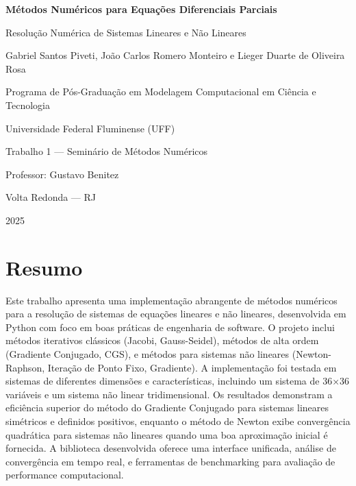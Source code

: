 \documentclass[12pt,a4paper]{article}
\begin{document}
\begin{titlepage}
  \begin{center}
    \vspace*{1.cm}

    {\LARGE \textbf{Métodos Numéricos para Equações Diferenciais Parciais} \par}
    \vspace{0.8cm}
    {\Large Resolução Numérica de Sistemas Lineares e Não Lineares \par}
    \vspace{2.5cm}

    {\large Gabriel Santos Piveti, João Carlos Romero Monteiro e Lieger Duarte de Oliveira Rosa \par}
    \vspace{1.5cm}
    {\small Programa de Pós-Graduação em Modelagem Computacional em Ciência e Tecnologia \par}
    {\small Universidade Federal Fluminense (UFF) \par}

    \vfill

    {\normalsize Trabalho 1 — Seminário de Métodos Numéricos \par}
    \vspace{0.3cm}
    {\normalsize Professor: Gustavo Benitez \par}
    \vspace{0.8cm}
    {\normalsize Volta Redonda — RJ \par}
    {\normalsize 2025 \par}
  \end{center}
\end{titlepage}


\section{Resumo}

Este trabalho apresenta uma implementação abrangente de métodos numéricos para a resolução de sistemas de equações lineares e não lineares, desenvolvida em Python com foco em boas práticas de engenharia de software. O projeto inclui métodos iterativos clássicos (Jacobi, Gauss-Seidel), métodos de alta ordem (Gradiente Conjugado, CGS), e métodos para sistemas não lineares (Newton-Raphson, Iteração de Ponto Fixo, Gradiente). A implementação foi testada em sistemas de diferentes dimensões e características, incluindo um sistema de 36×36 variáveis e um sistema não linear tridimensional. Os resultados demonstram a eficiência superior do método do Gradiente Conjugado para sistemas lineares simétricos e definidos positivos, enquanto o método de Newton exibe convergência quadrática para sistemas não lineares quando uma boa aproximação inicial é fornecida. A biblioteca desenvolvida oferece uma interface unificada, análise de convergência em tempo real, e ferramentas de benchmarking para avaliação de performance computacional.
\end{document}
